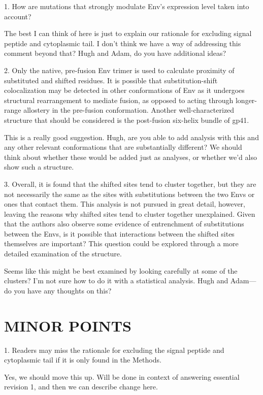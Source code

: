\documentclass[11pt, oneside]{article}   	%
\begin{document}
1. How are mutations that strongly modulate Env's expression level taken into account? 

{\color{red}
The best I can think of here is just to explain our rationale for excluding signal peptide and cytoplasmic tail. 
I don't think we have a way of addressing this comment beyond that?
Hugh and Adam, do you have additional ideas?
}

2. Only the native, pre-fusion Env trimer is used to calculate proximity of substituted and shifted residues. It is possible that substitution-shift colocalization may be detected in other conformations of Env as it undergoes structural rearrangement to mediate fusion, as opposed to acting through longer-range allostery in the pre-fusion conformation. Another well-characterized structure that should be considered is the post-fusion six-helix bundle of gp41. 

{\color{red}
This is a really good suggestion.
Hugh, are you able to add analysis with this and any other relevant conformations that are substantially different?
We should think about whether these would be added just as analyses, or whether we'd also show such a structure.
}

3. Overall, it is found that the shifted sites tend to cluster together, but they are not necessarily the same as the sites with substitutions between the two Envs or ones that contact them. This analysis is not pursued in great detail, however, leaving the reasons why shifted sites tend to cluster together unexplained. Given that the authors also observe some evidence of entrenchment of substitutions between the Envs, is it possible that interactions between the shifted sites themselves are important? This question could be explored through a more detailed examination of the structure. 

{\color{red}
Seems like this might be best examined by looking carefully at some of the clusters?
I'm not sure how to do it with a statistical analysis.
Hugh and Adam---do you have any thoughts on this?
}

\section*{MINOR POINTS}

1. Readers may miss the rationale for excluding the signal peptide and cytoplasmic tail if it is only found in the Methods. 

{\color{red}Yes, we should move this up. Will be done in context of answering essential revision 1, and then we can describe change here.}
\end{document}

